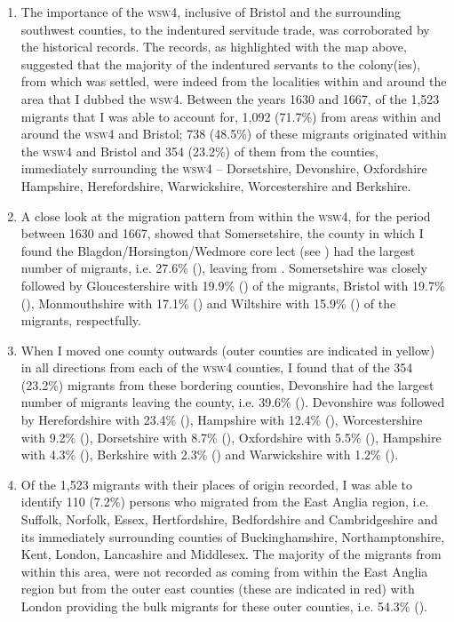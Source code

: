\begin{enumerate}
\item{The importance of the \textsc{wsw4}, inclusive of Bristol and the surrounding southwest counties, to the indentured servitude trade, was corroborated by the historical records. The records, as highlighted with the map above, suggested that the majority of the indentured servants to the colony(ies), from which  was settled, were indeed from the localities within and around the area that I dubbed the \textsc{wsw4}. Between the years 1630 and 1667, of the 1,523 migrants that I was able to account for, 1,092 (71.7\%) from areas within and around the \textsc{wsw4} and Bristol; 738 (48.5\%) of these migrants originated within the \textsc{wsw4} and Bristol and 354 (23.2\%) of them from the counties, immediately surrounding the \textsc{wsw4} -- Dorsetshire, Devonshire, Oxfordshire Hampshire, Herefordshire, Warwickshire, Worcestershire and Berkshire.}
\item{A close look at the migration pattern from within the \textsc{wsw4}, for the period between 1630 and 1667, showed that Somersetshire, the county in which I found the Blagdon/Horsington/Wedmore core lect (see ) had the largest number of migrants, i.e. 27.6\% (), leaving from . Somersetshire was closely followed by Gloucestershire with 19.9\% () of the migrants, Bristol with  19.7\% (), Monmouthshire with  17.1\% () and Wiltshire with 15.9\% () of the migrants, respectfully.}
\item{When I moved one county outwards (outer counties are indicated in yellow) in all directions from each of the \textsc{wsw4} counties, I found that of the 354 (23.2\%) migrants from these bordering counties, Devonshire had the largest number of migrants leaving the county, i.e. 39.6\% (). Devonshire was followed by Herefordshire with 23.4\% (), Hampshire with 12.4\% (), Worcestershire with 9.2\% (), Dorsetshire with 8.7\% (), Oxfordshire with 5.5\% (), Hampshire with 4.3\% (), Berkshire with 2.3\% () and Warwickshire with 1.2\% ().}
\item{Of the 1,523 migrants with their places of origin recorded, I was able to identify 110 (7.2\%) persons who migrated from the East Anglia region, i.e. Suffolk, Norfolk, Essex, Hertfordshire, Bedfordshire and Cambridgeshire and its immediately surrounding counties of Buckinghamshire, Northamptonshire, Kent, London, Lancashire and Middlesex. The majority of the migrants from within this area, were not recorded as coming from within the East Anglia region but from the outer east  counties (these are indicated in red) with London providing the bulk migrants for these outer counties, i.e. 54.3\% ().}

\end{enumerate}
